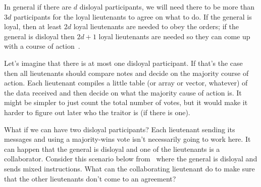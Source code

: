\documentclass[a4paper]{report}
\begin{document}
\begin{center}
\end{center}

In general if there are $d$ disloyal participants, we will need there to be more than $3d$ participants for the loyal lieutenants to agree on what to do. If the general is loyal, then at least $2d$ loyal lieutenants are needed to obey the orders; if the general is disloyal then $2d+1$ loyal lieutenants are needed so they can come up with a course of action~\cite{mte241}.

Let's imagine that there is at most one disloyal participant. If that's the case then all lieutenants should compare notes and decide on the majority course of action. Each lieutenant compiles a little table (or array or vector, whatever) of the data received and then decide on what the majority cause of action is. It might be simpler to just count the total number of votes, but it would make it harder to figure out later who the traitor is (if there is one).

What if we can have two disloyal participants? Each lieutenant sending its messages and using a majority-wins vote isn't necessarily going to work here. It can happen that the general is disloyal and one of the lieutenants is a collaborator. Consider this scenario below from~\cite{mte241} where the general is disloyal and sends mixed instructions. What can the collaborating lieutenant do to make sure that the other lieutenants don't come to an agreement?

\begin{center}
\end{center}
\end{document}
